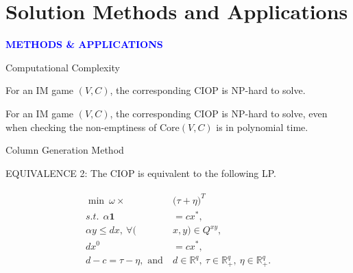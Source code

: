 \documentclass[14pt]{beamer}
\newcommand{\R}{\mathbb{R}}
\begin{document}
\section{Solution Methods and Applications}
\begin{frame}
\centering
\large
\textcolor{blue}{\bf {\huge M}ETHODS \& {\huge A}PPLICATIONS}
\end{frame}
\begin{frame}{Computational Complexity}
\begin{lemma}\label{lemma:nphard}
\justifying
For an IM game $(V,C)$, the corresponding CIOP is NP-hard to solve.
\end{lemma}
\begin{lemma}\label{lemma:nphard2}
\justifying
For an IM game $(V,C)$, the corresponding CIOP is NP-hard to solve, even when checking the non-emptiness of $\mathrm{Core}(V,C)$ is in polynomial time.
\end{lemma}
\end{frame}

\begin{frame}{Column Generation Method}
\begin{lemma}\label{lemma:equivalence1}
\centering
\small
EQUIVALENCE 2: The CIOP is equivalent to the following LP.
\end{lemma}
\small
\begin{eqnarray*}\label{eqn:cplp}
\begin{aligned}
\min ~\omega \times &\big(\tau + \eta\big)^T\\
s.t.~~\alpha \textbf{1} &= cx^*,\\
\alpha y \leq dx,~\forall (&x,y) \in Q^{xy},\\
dx^0 &= cx^*,\\
d-c = \tau - \eta, \mbox{ and} ~&d \in \R^{q}, ~\tau \in \R^{q}_+, ~\eta \in \R^{q}_+.
\end{aligned}
\end{eqnarray*}
\end{frame}
\end{document}
